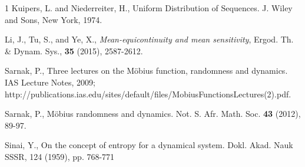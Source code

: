 \documentclass[12pt,letterpaper]{amsart}
\begin{document}
\begin{thebibliography}{1}
 Kuipers, L. and Niederreiter, H., Uniform Distribution of Sequences. J. Wiley and Sons, New York, 1974.

 Li, J., Tu, S., and Ye, X., {\em Mean-equicontinuity and mean sensitivity}, Ergod. Th. \& Dynam. Sys., {\bf 35} (2015), 2587-2612.

 Sarnak, P., Three lectures on the M\"{o}bius function, randomness and dynamics. IAS Lecture Notes, 2009;\\ http://publications.ias.edu/sites/default/files/MobiusFunctionsLectures(2).pdf.

 Sarnak, P., M\"{o}bius randomness and dynamics. Not. S. Afr. Math. Soc. {\bf 43} (2012), 89-97.

 Sinai, Y., On the concept of entropy for a dynamical system. Dokl. Akad. Nauk SSSR, 124 (1959), pp. 768-771

 \end{thebibliography}
 
\end{document}
